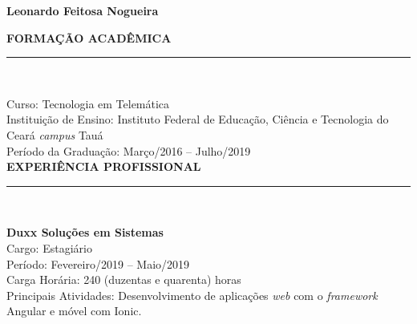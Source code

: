 \documentclass[a4paper,12pt]{article}
\begin{document}
	
{\LARGE\textbf{Leonardo Feitosa Nogueira}}\\



\vspace{.6cm}
\textbf{FORMAÇÃO ACADÊMICA}\par
\vspace{-2.0mm}
\rule{\linewidth}{1.25pt}\\
\vspace{-2.0mm}

Curso: Tecnologia em Telemática\\
Instituição de Ensino: Instituto Federal de Educação, Ciência e Tecnologia do Ceará \textit{campus} Tauá\\
Período da Graduação: Março/2016 -- Julho/2019\\


\textbf{EXPERIÊNCIA PROFISSIONAL}\par
\vspace{-2.0mm}
\rule{\linewidth}{1.25pt}\\
\vspace{-2.0mm}

\textbf{Duxx Soluções em Sistemas}\\

Cargo: Estagiário\\
Período: Fevereiro/2019 -- Maio/2019\\
Carga Horária: 240 (duzentas e quarenta) horas\\
Principais Atividades: Desenvolvimento de aplicações \textit{web} com o 
\textit{framework} Angular e móvel com Ionic.\\
\end{document}

